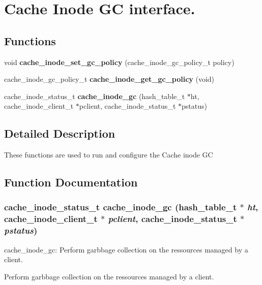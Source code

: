 \section{Cache Inode GC interface.}
\label{group__Cache__inode__gc__interface}
\subsection*{Functions}
\begin{CompactItemize}
\item 
void {\bf cache\_\-inode\_\-set\_\-gc\_\-policy} (cache\_\-inode\_\-gc\_\-policy\_\-t policy)
\item 
cache\_\-inode\_\-gc\_\-policy\_\-t {\bf cache\_\-inode\_\-get\_\-gc\_\-policy} (void)
\item 
cache\_\-inode\_\-status\_\-t {\bf cache\_\-inode\_\-gc} (hash\_\-table\_\-t $\ast$ht, cache\_\-inode\_\-client\_\-t $\ast$pclient, cache\_\-inode\_\-status\_\-t $\ast$pstatus)
\end{CompactItemize}


\subsection{Detailed Description}
These functions are used to run and configure the Cache inode GC 

\subsection{Function Documentation}
\subsubsection{\setlength{\rightskip}{0pt plus 5cm}cache\_\-inode\_\-status\_\-t cache\_\-inode\_\-gc (hash\_\-table\_\-t $\ast$ {\em ht}, cache\_\-inode\_\-client\_\-t $\ast$ {\em pclient}, cache\_\-inode\_\-status\_\-t $\ast$ {\em pstatus})}\label{group__Cache__inode__gc__interface_ga2}


cache\_\-inode\_\-gc: Perform garbbage collection on the ressources managed by a client.

Perform garbbage collection on the ressources managed by a client.

